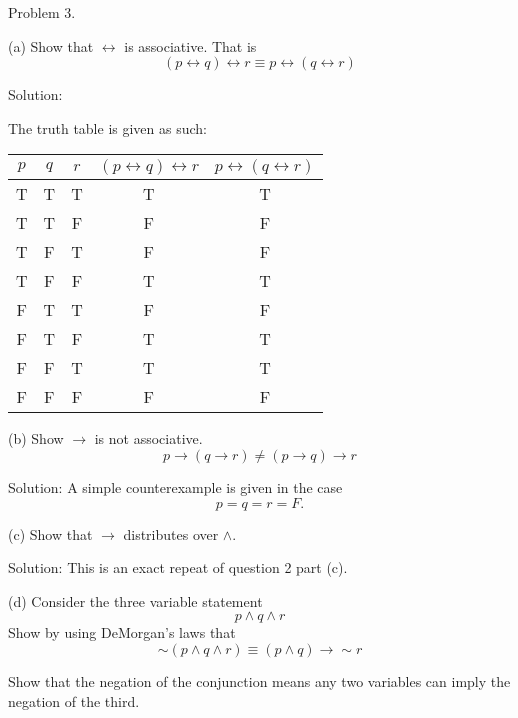 \documentclass[16 pt]{amsart}
\theoremstyle{definition}
\theoremstyle{remark}
\numberwithin{equation}{subsection}
\begin{document}
\newpage

Problem 3. 

(a) Show that $\leftrightarrow$ is associative. That is
\[
(p \leftrightarrow q) \leftrightarrow r \equiv p \leftrightarrow ( q \leftrightarrow r)
\]

\vspace{.5in}

Solution:

The truth table is given as such:


\begin{center}
\begin{tabular}{c | c | c | c | c}
$p$ & $q$ & $r$ & $(p\leftrightarrow q) \leftrightarrow r$ & $p\leftrightarrow (q \leftrightarrow r)$\\ 
\hline
T & T & T & T & T\\
T & T & F & F & F\\
T & F & T & F & F\\
T & F & F & T & T\\
F & T & T & F & F\\
F & T & F & T & T\\
F & F & T & T & T\\
F & F & F & F & F\\
\end{tabular}
\end{center}

\vspace{.5in}

(b) Show $\rightarrow$ is not associative.  
\[
p \rightarrow (q \rightarrow r) \neq (p \rightarrow q) \rightarrow r
\]

\vspace{.5in}

Solution: A simple counterexample is given in the case
\[
p = q = r = F.
\]

\vspace{.5in}

(c) Show that $\rightarrow$ distributes over $\wedge$.

\vspace{.5in}

Solution: This is an exact repeat of question 2 part (c).


\vspace{.5in}

(d) Consider the three variable statement
\[
p\wedge q \wedge r
\]
Show by using DeMorgan's laws that
\[
\sim(p\wedge q\wedge r) \equiv (p\wedge q) \rightarrow \sim r
\]

Show that the negation of the conjunction means any two  variables can imply the negation of the third.
\end{document}
